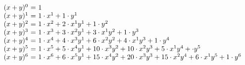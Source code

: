 \documentclass[11pt,a4paper]{article}
\begin{document}
$$\begin{array}{l@{$ = $}l}
(x+y)^0 & 1\\
(x+y)^1 & 1\cdot x^1 + 1\cdot y^1\\
(x+y)^2 & 1\cdot x^2 + 2\cdot x^1y^1 + 1\cdot y^2\\
(x+y)^3 & 1\cdot x^3 + 3\cdot x^2y^1 + 3\cdot x^1y^2 + 1\cdot y^3\\
(x+y)^4 & 1\cdot x^4 + 4\cdot x^3y^1 + 6\cdot x^2y^2 + 4\cdot x^1y^3 + 1\cdot y^4\\
(x+y)^5 & 1\cdot x^5 + 5\cdot x^4y^1 + 10\cdot x^3y^2 + 10\cdot x^2y^3 + 5\cdot x^1y^4 + \cdot y^5\\
(x+y)^6 & 1\cdot x^6 + 6\cdot x^5y^1 + 15\cdot x^4y^2 + 20\cdot x^3y^3 + 15\cdot x^2y^4 + 6\cdot x^1y^5 + 1\cdot y^6
\end{array}$$
\end{document}
